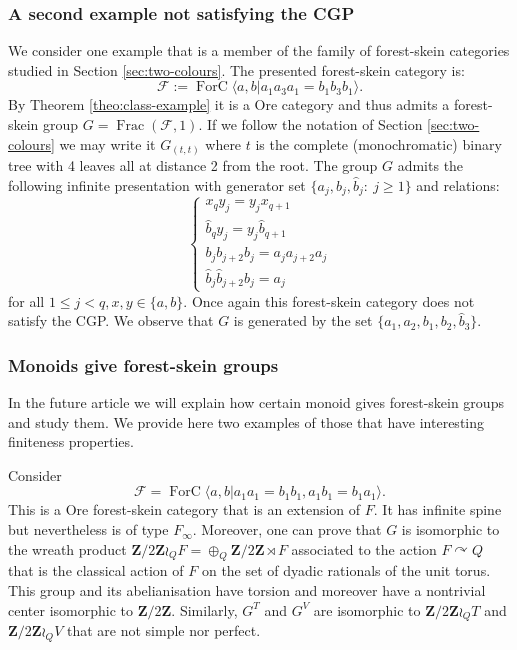 \documentclass[a4paper, 12pt]{amsart}
\numberwithin{equation}{section}
\theoremstyle{definition}
\newcommand{\act}{\curvearrowright}
\newcommand{\cF}{\mathcal F}
\DeclareMathOperator{\Frac}{Frac}
\DeclareMathOperator{\FC}{ForC}
\newcommand{\la}{\langle}
\newcommand{\ra}{\rangle}
\newcommand{\Z}{\mathbf{Z}}
\begin{document}
\subsubsection{A second example not satisfying the CGP}\label{sec:example-no-CGP}
We consider one example that is a member of the family of forest-skein categories studied in Section \ref{sec:two-colours}.
The presented forest-skein category is:
$$\cF:=\FC\la a,b | a_1a_3a_1 = b_1b_3b_1\ra.$$
By Theorem \ref{theo:class-example} it is a Ore category and thus admits a forest-skein group $G=\Frac(\cF,1)$.
If we follow the notation of Section \ref{sec:two-colours} we may write it $G_{(t,t)}$ where $t$ is the complete (monochromatic) binary tree with 4 leaves all at distance 2 from the root.
The group $G$ admits the following infinite presentation with generator set $\{a_j,b_j,\hat b_j:\ j\geq 1\}$ and relations:
$$\begin{cases}
 x_{q} y_{j} = y_{j} x_{q+1} \\
\hat b_{q} y_{j} = y_{j} \hat b_{q+1} \\
b_j b_{j+2} b_j = a_ja_{j+2} a_j\\
\hat b_j \hat b_{j+2} b_j = a_j
\end{cases}$$
for all $1\leq j<q, x,y\in\{a,b\}$.
Once again this forest-skein category does not satisfy the CGP. 
We observe that $G$ is generated by the set $\{a_1,a_2,b_1,b_2, \hat b_3\}$.

\subsubsection{Monoids give forest-skein groups}
In the future article \cite{Brothier22-HPM} we will explain how certain monoid gives forest-skein groups and study them.
We provide here two examples of those that have interesting finiteness properties.

Consider 
$$\cF=\FC\la a,b| a_1a_1=b_1b_1, a_1b_1=b_1a_1\ra.$$
This is a Ore forest-skein category that is an extension of $F$. 
It has infinite spine but nevertheless is of type $F_\infty$. 
Moreover, one can prove that $G$ is isomorphic to the wreath product $\Z/2\Z\wr_Q F=\oplus_{Q}\Z/2\Z\rtimes F$ associated to the action $F\act Q$ that is the classical action of $F$ on the set of dyadic rationals of the unit torus.
This group and its abelianisation have torsion and moreover have a nontrivial center isomorphic to $\Z/2\Z.$
Similarly, $G^T$ and $G^V$ are isomorphic to $\Z/2\Z\wr_Q T$ and $\Z/2\Z\wr_Q V$ that are not simple nor perfect.
\end{document}
